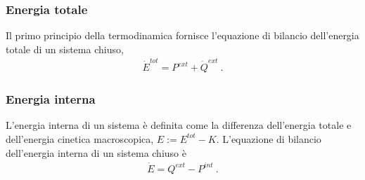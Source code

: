 \documentclass[letterpaper,10pt,english]{jupyterBook}
\begin{document}
\subsubsection{Energia totale}
\label{\detokenize{ch/circuits-electromechanic:energia-totale}}
\sphinxAtStartPar
Il primo principio della termodinamica fornisce l’equazione di bilancio dell’energia totale di un sistema chiuso,
\begin{equation*}
\begin{split}\dot{E}^{tot} = P^{ext} + \dot{Q}^{ext} \ .\end{split}
\end{equation*}

\subsubsection{Energia interna}
\label{\detokenize{ch/circuits-electromechanic:energia-interna}}
\sphinxAtStartPar
L’energia interna di un sistema è definita come la differenza dell’energia totale e dell’energia cinetica macroscopica, \(E := E^{tot} - K\). L’equazione di bilancio dell’energia interna di un sistema chiuso è
\begin{equation*}
\begin{split}\dot{E} = Q^{ext} - P^{int} \ .\end{split}
\end{equation*}
\end{document}
